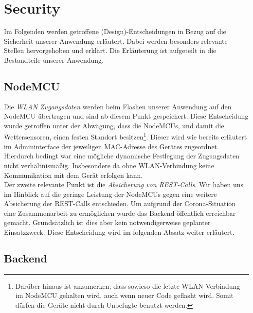 

\section{Security}\label{Security}
Im Folgenden werden getroffene (Design)-Entscheidungen in Bezug auf die Sicherheit unserer Anwendung erläutert.
Dabei werden besonders relevante Stellen hervorgehoben und erklärt.
Die Erläuterung ist aufgeteilt in die Bestandteile unserer Anwendung.

\subsection{NodeMCU}

Die \textit{WLAN Zugangsdaten} werden beim Flashen unserer Anwendung auf den NodeMCU übertragen und sind ab diesem Punkt gespeichert.
Diese Entscheidung wurde getroffen unter der Abwägung, dass die NodeMCUs, und damit die Wettersensoren, einen festen Standort besitzen\footnote{Darüber hinaus ist anzumerken, dass sowieso die letzte WLAN-Verbindung im NodeMCU gehalten wird, auch wenn neuer Code geflasht wird. Somit dürfen die Geräte nicht durch Unbefugte benutzt werden.}.
Dieser wird wie bereits erläutert im Admininterface der jeweiligen MAC-Adresse des Gerätes zugeordnet.
Hierdurch bedingt war eine mögliche dynamische Festlegung der Zugangsdaten nicht verhältnismäßig.
Insbesondere da ohne WLAN-Verbindung keine Kommunikation mit dem Gerät erfolgen kann.\\
Der zweite relevante Punkt ist die \textit{Absicherung von REST-Calls}.
Wir haben uns im Hinblick auf die geringe Leistung der NodeMCUs gegen eine weitere Absicherung der REST-Calls entschieden.
Um aufgrund der Corona-Situation eine Zusammenarbeit zu ermöglichen wurde das Backend öffentlich erreichbar gemacht.
Grundsätzlich ist dies aber kein notwendigerweise geplanter Einsatzzweck.
Diese Entscheidung wird im folgenden Absatz weiter erläutert.

\subsection{Backend}

